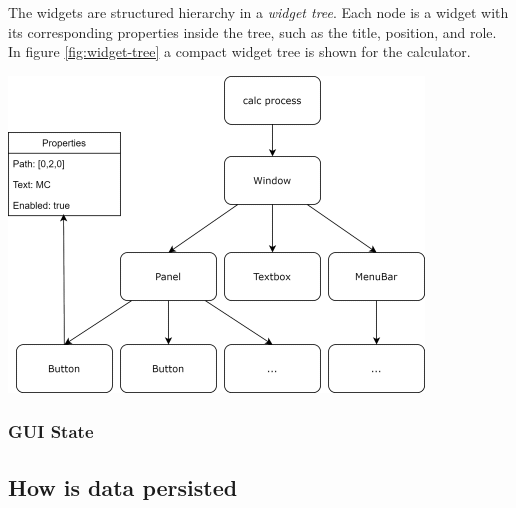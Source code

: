  The widgets are structured hierarchy in a \emph{widget tree}. Each node is a widget with its corresponding properties inside the tree, such as the title, position, and role. In figure \ref{fig:widget-tree} a compact widget tree is shown for the calculator. 

\includegraphics{pics/calc-tree.png}
\label{fig:widget-tree}



\subsubsection{GUI State} \label{gui-state}

\subsection{How is data persisted}

